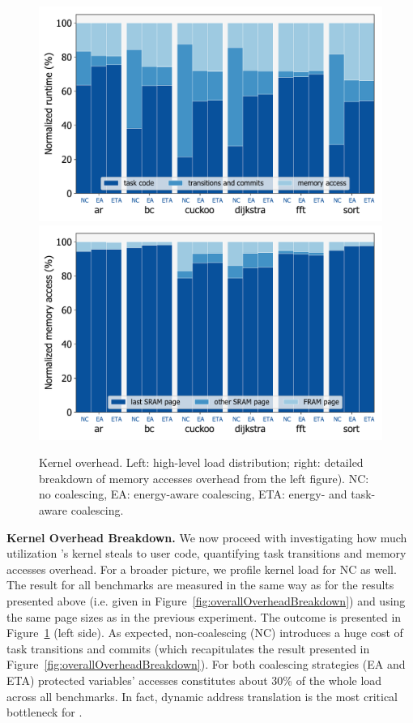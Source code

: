 \begin{figure}
	\centering
	\includegraphics[width=0.49\columnwidth]{figures/overallOverhead}
	\includegraphics[width=0.49\columnwidth]{figures/memAccess}
	\caption{Kernel overhead. Left: high-level load distribution; right: detailed breakdown of memory accesses overhead from the left figure). NC: no coalescing, EA: energy-aware coalescing, ETA: energy- and task-aware coalescing. }
	\label{fig:coalEfficiency}
\end{figure}

\textbf{Kernel Overhead Breakdown.} We now proceed with investigating how much utilization \sys's kernel steals to user code, quantifying task transitions and memory accesses overhead. For a broader picture, we profile kernel load for NC as well. The result for all benchmarks are measured in the same way as for the results presented above (i.e. given in Figure~\ref{fig:overallOverheadBreakdown}) and using the same page sizes as in the previous experiment. The outcome is presented in Figure~\ref{fig:coalEfficiency} (left side).
%
As expected, non-coalescing (NC) \sys introduces a huge cost of task transitions and commits (which recapitulates the result presented in Figure~\ref{fig:overallOverheadBreakdown}). For both coalescing strategies (EA and ETA) protected variables' accesses constitutes about 30\% of the whole load across all benchmarks. In fact, dynamic address translation is the most critical bottleneck for \sys.

